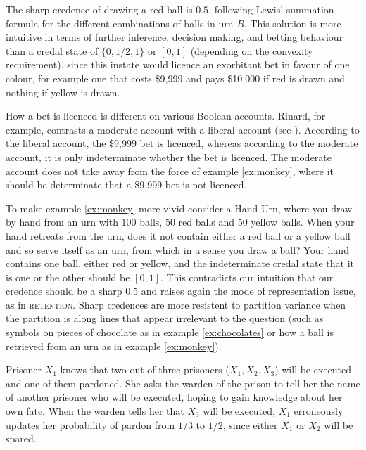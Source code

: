 \documentclass[11pt]{article}
\begin{document}
The sharp credence of drawing a red ball is $0.5$, following Lewis'
summation formula for the different combinations of balls in urn $B$.
This solution is more intuitive in terms of further inference,
decision making, and betting behaviour than a credal state of
$\{0,1/2,1\}$ or $[0,1]$ (depending on the convexity requirement),
since this instate would licence an exorbitant bet in favour of one
colour, for example one that costs \$9,999 and pays \$10,000 if red is
drawn and nothing if yellow is drawn. 

How a bet is licenced is different on various Boolean accounts.
Rinard, for example, contrasts a moderate account with a liberal
account (see ). According to the liberal
account, the \$9,999 bet is licenced, whereas according to the
moderate account, it is only indeterminate whether the bet is
licenced. The moderate account does not take away from the force of
example \ref{ex:monkey}, where it should be determinate that a \$9,999
bet is not licenced.

To make example \ref{ex:monkey} more vivid consider a Hand Urn, where
you draw by hand from an urn with 100 balls, 50 red balls and 50
yellow balls. When your hand retreats from the urn, does it not
contain either a red ball or a yellow ball and so serve itself as an
urn, from which in a sense you draw a ball? Your hand contains one
ball, either red or yellow, and the indeterminate credal state that it
is one or the other should be $[0,1]$. This contradicts our intuition
that our credence should be a sharp $0.5$ and raises again the mode of
representation issue, as in \textsc{retention}. Sharp credences are
more resistent to partition variance when the partition is along lines
that appear irrelevant to the question (such as symbols on pieces of
chocolate as in example \ref{ex:chocolates} or how a ball is retrieved
from an urn as in example \ref{ex:monkey}).

\begin{quotex}
  \label{ex:threepris} Prisoner $X_{1}$
  knows that two out of three prisoners ($X_{1},X_{2},X_{3}$) will be
  executed and one of them pardoned. She asks the warden of the prison
  to tell her the name of another prisoner who will be executed,
  hoping to gain knowledge about her own fate. When the warden tells
  her that $X_{3}$ will be executed, $X_{1}$ erroneously updates her
  probability of pardon from $1/3$ to $1/2$, since either $X_{1}$ or
  $X_{2}$ will be spared.
\end{quotex}
\end{document}
